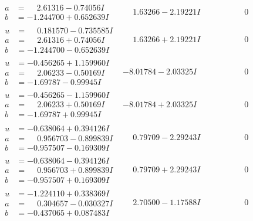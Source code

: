\documentclass[1p]{elsarticle_modified}
\theoremstyle{definition}
\begin{document}
$$\begin{array}{c|c|c}
\begin{aligned}
a &= \phantom{-}2.61316 - 0.74056 I \\
b &= -1.244700 + 0.652639 I\end{aligned}
 & \phantom{-}1.63266 - 2.19221 I & \phantom{-0.000000 } 0 \\ \hline\begin{aligned}
u &= \phantom{-}0.181570 - 0.735585 I \\
a &= \phantom{-}2.61316 + 0.74056 I \\
b &= -1.244700 - 0.652639 I\end{aligned}
 & \phantom{-}1.63266 + 2.19221 I & \phantom{-0.000000 } 0 \\ \hline\begin{aligned}
u &= -0.456265 + 1.159960 I \\
a &= \phantom{-}2.06233 - 0.50169 I \\
b &= -1.69787 - 0.99945 I\end{aligned}
 & -8.01784 - 2.03325 I & \phantom{-0.000000 } 0 \\ \hline\begin{aligned}
u &= -0.456265 - 1.159960 I \\
a &= \phantom{-}2.06233 + 0.50169 I \\
b &= -1.69787 + 0.99945 I\end{aligned}
 & -8.01784 + 2.03325 I & \phantom{-0.000000 } 0 \\ \hline\begin{aligned}
u &= -0.638064 + 0.394126 I \\
a &= \phantom{-}0.956703 - 0.899839 I \\
b &= -0.957507 - 0.169309 I\end{aligned}
 & \phantom{-}0.79709 - 2.29243 I & \phantom{-0.000000 } 0 \\ \hline\begin{aligned}
u &= -0.638064 - 0.394126 I \\
a &= \phantom{-}0.956703 + 0.899839 I \\
b &= -0.957507 + 0.169309 I\end{aligned}
 & \phantom{-}0.79709 + 2.29243 I & \phantom{-0.000000 } 0 \\ \hline\begin{aligned}
u &= -1.224110 + 0.338369 I \\
a &= \phantom{-}0.304657 - 0.030327 I \\
b &= -0.437065 + 0.087483 I\end{aligned}
 & \phantom{-}2.70500 - 1.17588 I & \phantom{-0.000000 } 0 \\ \hline\begin{aligned}

\end{aligned}
\end{array}$$
\end{document}
